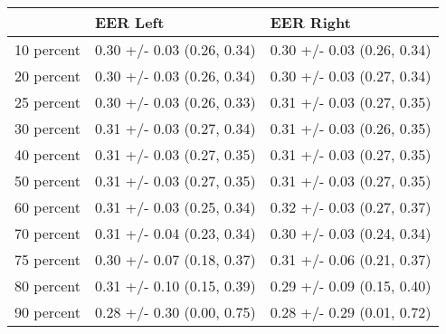 \begin{tabular}{lll}
\toprule
{} &                    EER Left &                   EER Right \\
\midrule
10 percent &  0.30 +/- 0.03 (0.26, 0.34) &  0.30 +/- 0.03 (0.26, 0.34) \\
20 percent &  0.30 +/- 0.03 (0.26, 0.34) &  0.30 +/- 0.03 (0.27, 0.34) \\
25 percent &  0.30 +/- 0.03 (0.26, 0.33) &  0.31 +/- 0.03 (0.27, 0.35) \\
30 percent &  0.31 +/- 0.03 (0.27, 0.34) &  0.31 +/- 0.03 (0.26, 0.35) \\
40 percent &  0.31 +/- 0.03 (0.27, 0.35) &  0.31 +/- 0.03 (0.27, 0.35) \\
50 percent &  0.31 +/- 0.03 (0.27, 0.35) &  0.31 +/- 0.03 (0.27, 0.35) \\
60 percent &  0.31 +/- 0.03 (0.25, 0.34) &  0.32 +/- 0.03 (0.27, 0.37) \\
70 percent &  0.31 +/- 0.04 (0.23, 0.34) &  0.30 +/- 0.03 (0.24, 0.34) \\
75 percent &  0.30 +/- 0.07 (0.18, 0.37) &  0.31 +/- 0.06 (0.21, 0.37) \\
80 percent &  0.31 +/- 0.10 (0.15, 0.39) &  0.29 +/- 0.09 (0.15, 0.40) \\
90 percent &  0.28 +/- 0.30 (0.00, 0.75) &  0.28 +/- 0.29 (0.01, 0.72) \\
\bottomrule
\end{tabular}
